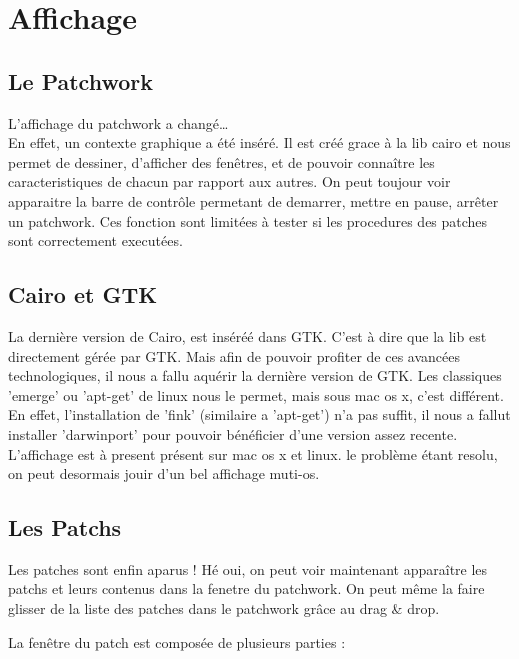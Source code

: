 \newpage
\section{Affichage}

\subsection{Le Patchwork}
\par
L'affichage du patchwork a chang\'e\ldots 
\\
En effet, un contexte graphique a \'et\'e ins\'er\'e. Il est cr\'e\'e grace \`a la lib cairo
et nous permet de dessiner, d'afficher des fen\^etres, et de pouvoir conna\^itre les 
caracteristiques de chacun par rapport aux autres. On peut toujour voir apparaitre 
la barre de contr\^ole permetant de demarrer, mettre en pause, arr\^eter un patchwork. 
Ces fonction sont limit\'ees \`a tester si les procedures des patches sont 
correctement execut\'ees.
\\

\subsection{Cairo et GTK}
\par
La derni\`ere version de Cairo, est ins\'er\'e\'e dans GTK. C'est \`a dire que la lib est 
directement g\'er\'ee par GTK. Mais afin de pouvoir profiter de ces avanc\'ees 
technologiques, il nous a fallu aqu\'erir la derni\`ere version de GTK. Les classiques 
'emerge' ou 'apt-get' de linux nous le permet, mais sous mac os x, c'est diff\'erent. 
En effet, l'installation de 'fink' (similaire a 'apt-get') n'a pas suffit, il nous 
a fallut installer 'darwinport' pour pouvoir b\'en\'eficier d'une version assez recente.
L'affichage est \`a present pr\'esent sur mac os x et linux. le probl\`eme \'etant resolu, 
on peut desormais jouir d'un bel affichage muti-os.
\newpage
\subsection{Les Patchs}
\par
Les patches sont enfin aparus ! H\'e oui, on peut voir maintenant appara\^itre les patchs 
et leurs contenus dans la fenetre du patchwork. On peut m\^eme la faire glisser de la 
liste des patches dans le patchwork gr\^ace au drag \& drop. 
\\
\par
La fen\^etre du patch est compos\'ee de plusieurs parties :

